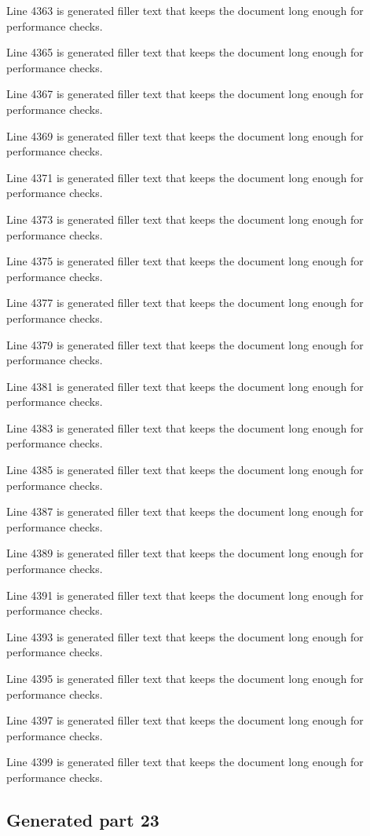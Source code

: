 Line 4363 is generated filler text that keeps the document long enough for performance checks.

Line 4365 is generated filler text that keeps the document long enough for performance checks.

Line 4367 is generated filler text that keeps the document long enough for performance checks.

Line 4369 is generated filler text that keeps the document long enough for performance checks.

Line 4371 is generated filler text that keeps the document long enough for performance checks.

Line 4373 is generated filler text that keeps the document long enough for performance checks.

Line 4375 is generated filler text that keeps the document long enough for performance checks.

Line 4377 is generated filler text that keeps the document long enough for performance checks.

Line 4379 is generated filler text that keeps the document long enough for performance checks.

Line 4381 is generated filler text that keeps the document long enough for performance checks.

Line 4383 is generated filler text that keeps the document long enough for performance checks.

Line 4385 is generated filler text that keeps the document long enough for performance checks.

Line 4387 is generated filler text that keeps the document long enough for performance checks.

Line 4389 is generated filler text that keeps the document long enough for performance checks.

Line 4391 is generated filler text that keeps the document long enough for performance checks.

Line 4393 is generated filler text that keeps the document long enough for performance checks.

Line 4395 is generated filler text that keeps the document long enough for performance checks.

Line 4397 is generated filler text that keeps the document long enough for performance checks.

Line 4399 is generated filler text that keeps the document long enough for performance checks.

\subsection{Generated part 23}


